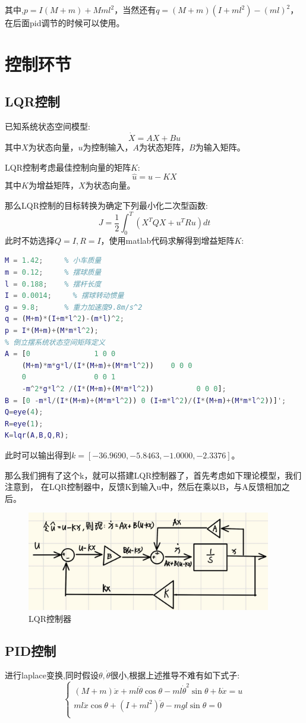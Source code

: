 \documentclass{article}
\begin{document}
其中,$p=I(M+m)+Mml^2$，当然还有$q=(M+m)(I+ml^2)-(ml)^2$，在后面pid调节的时候可以使用。
\section*{控制环节}
\subsection*{LQR控制}
已知系统状态空间模型:
\[
\dot{X}=AX+Bu
\]
其中$X$为状态向量，$u$为控制输入，$A$为状态矩阵，$B$为输入矩阵。

LQR控制考虑最佳控制向量的矩阵$K$:
\[
\hat{u}=u-KX
\]
其中$K$为增益矩阵，$X$为状态向量。

那么LQR控制的目标转换为确定下列最小化二次型函数:
\[
J=\frac{1}{2}\int_{0}^{T}(X^TQX+u^TRu)dt
\]
此时不妨选择$Q=I,R=I$，使用matlab代码求解得到增益矩阵$K$:
\begin{lstlisting}[language=matlab,numbers=none]
% 倒立摆系统参数
M = 1.42;     % 小车质量
m = 0.12;     % 摆球质量
l = 0.188;    % 摆杆长度
I = 0.0014;     % 摆球转动惯量
g = 9.8;      % 重力加速度9.8m/s^2
q = (M+m)*(I+m*l^2)-(m*l)^2;
p = I*(M+m)+(M*m*l^2);
% 倒立摆系统状态空间矩阵定义
A = [0               1 0 0
    (M+m)*m*g*l/(I*(M+m)+(M*m*l^2))    0 0 0
    0                0 0 1
    -m^2*g*l^2 /(I*(M+m)+(M*m*l^2))          0 0 0];
B = [0 -m*l/(I*(M+m)+(M*m*l^2)) 0 (I+m*l^2)/(I*(M+m)+(M*m*l^2))]';
Q=eye(4);
R=eye(1);
K=lqr(A,B,Q,R);
\end{lstlisting}
此时可以输出得到$k=[-36.9690   ,-5.8463   ,-1.0000   ,-2.3376]$。

那么我们拥有了这个k，就可以搭建LQR控制器了，首先考虑如下理论模型，我们注意到，
在LQR控制器中，反馈K到输入u中，然后在乘以B，与A反馈相加之后。
\begin{figure}[htbp]
    \centering
    \includegraphics[width=0.95\textwidth]{./imgs/LQR_OPTi.png}
    \caption{LQR控制器}
\end{figure}

\subsection*{PID控制}
进行laplace变换,同时假设$\theta,\dot{\theta}$很小,根据上述推导不难有如下式子:
\[\left\{\begin{matrix}
    (M+m)\ddot{x}+ml\ddot{\theta}\cos\theta -ml\dot{\theta}^2\sin\theta + b\dot{x} = u \\
    ml\ddot{x}\cos\theta+(I+ml^2)\ddot{\theta}-mgl\sin\theta = 0 \\
\end{matrix}
\right.\]
\end{document}
